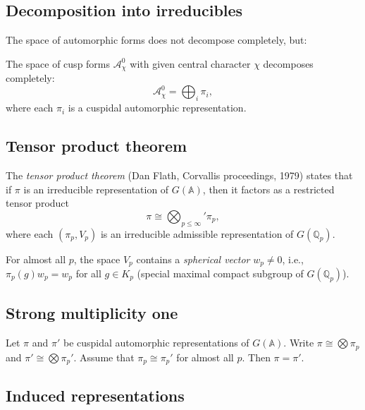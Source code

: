 \documentclass[reqno]{amsart} 
\begin{document}
\subsection{Decomposition into irreducibles}

The space of automorphic forms does not decompose completely, but:

\begin{theorem}
  The space of cusp forms $\mathcal{A}^0_{\chi}$ with given central character $\chi$ decomposes completely:
  \begin{equation*}
    \mathcal{A}_{\chi}^0 = \bigoplus_i \pi_i,
  \end{equation*}
  where each $\pi_i$ is a cuspidal automorphic representation.
\end{theorem}

\subsection{Tensor product theorem}

The \emph{tensor product theorem} (Dan Flath, Corvallis proceedings, 1979) states that if $\pi$ is an irreducible representation of $G(\mathbb{A})$, then it factors as a restricted tensor product
\begin{equation*}
  \pi \cong \bigotimes_{p \leq \infty}' \pi_p,
\end{equation*}
where each $(\pi_p, V_p)$ is an irreducible admissible representation of $G(\mathbb{Q}_p)$.

For almost all $p$, the space $V_p$ contains a \emph{spherical vector} $w_p \neq 0$, i.e., $\pi_p(g) w_p = w_p$ for all $g \in K_p$ (special maximal compact subgroup of $G(\mathbb{Q}_p)$).

\subsection{Strong multiplicity one}

\begin{theorem}
  Let $\pi$ and $\pi '$ be cuspidal automorphic representations of $G(\mathbb{A})$.  Write $\pi \cong \bigotimes \pi_p$ and $\pi ' \cong \bigotimes \pi_p '$.  Assume that $\pi_p \cong \pi_p '$ for almost all $p$.  Then $\pi = \pi '$.
\end{theorem}

\subsection{Induced representations}\label{sec:cnohg6010e}
\end{document}
